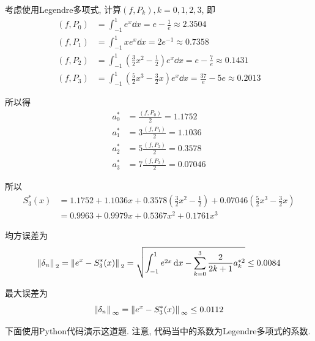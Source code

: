 \begin{solution}
    考虑使用Legendre多项式, 计算$(f,P_k),k=0,1,2,3$, 即
    \begin{align*}
        (f,P_0)&=\int_{-1}^1e^x\dd{x}=e-\frac{1}{e}\approx2.3504\\
        (f,P_1)&=\int_{-1}^1xe^x\dd{x}=2e^{-1}\approx0.7358\\
        (f,P_2)&=\int_{-1}^1\left(\frac{3}{2}x^2-\frac{1}{2}\right)e^x\dd{x}=e-\frac{7}{e}\approx0.1431\\
        (f,P_3)&=\int_{-1}^1\left(\frac{5}{2}x^3-\frac{3}{2}x\right)e^x\dd{x}=\frac{37}{e}-5e\approx0.2013
    \end{align*}

    所以得
    \begin{align*}
        a_0^*&=\frac{(f,P_0)}{2}=1.1752\\
        a_1^*&=3\frac{(f,P_1)}{2}=1.1036\\
        a_2^*&=5\frac{(f,P_2)}{2}=0.3578\\
        a_3^*&=7\frac{(f,P_3)}{2}=0.07046
    \end{align*}
    
    所以
    \begin{align*}
        S_3^*(x)&=1.1752+1.1036x+0.3578\left(\frac{3}{2}x^2-\frac{1}{2}\right)+0.07046\left(\frac{5}{2}x^3-\frac{3}{2}x\right)\\
        &=0.9963+0.9979x+0.5367x^2+0.1761x^3
    \end{align*}

    均方误差为
    \begin{equation*}
        \norm*{\delta_n}_2=\norm*{e^x-S_3^*(x)}_2=\sqrt{\int_{-1}^1e^{2x}\dd{x}-\sum_{k=0}^3\frac{2}{2k+1}a_k^{*2}}\le0.0084
    \end{equation*}

    最大误差为
    \begin{equation*}
        \norm*{\delta_n}_\infty=\norm*{e^x-S_3^*(x)}_\infty\le0.0112
    \end{equation*}
\end{solution}

下面使用Python代码演示这道题. 注意, 代码当中的系数为Legendre多项式的系数.

